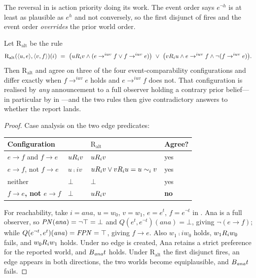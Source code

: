\documentclass[11pt,a4paper]{article}
\begin{document}
The reversal in  is action priority doing its work. The event order says
$e^{\neg h}$ is at least as plausible as $e^{h}$ and not conversely, so the first disjunct of
 fires and the event order \emph{overrides} the prior world order.

\begin{proposition}
\label{prop:divergence}
Let $\mathrm{R}_{\mathrm{alt}}$ be the rule
\[
  \mathrm{R}_{\mathrm{alt}}(\langle u,e\rangle,\langle v,f\rangle)(i) \ =\
  \big(u \plaus{i} v \wedge (e \to^{iuv} f \vee f \to^{iuv} e)\big) \ \vee\
  \big(v \plaus{i} u \wedge e \to^{iuv} f \wedge \neg (f \to^{iuv} e)\big).
\]
Then $\mathrm{R}_{\mathrm{alt}}$ and \Cref{def:update} agree on three of the four
event-comparability configurations and differ exactly when $f \to^{iuv} e$ holds and $e
\to^{iuv} f$ does not. That configuration is realised by \emph{any} announcement to a full
observer holding a contrary prior belief---in particular by \code{drone\_reports()} in
\Cref{lst:sar}---and the two rules then give contradictory answers to whether the
report lands.
\end{proposition}

\begin{proof}
Case analysis on the two edge predicates:
\begin{center}
\begin{tabular}{@{}llll@{}}
\toprule
Configuration & \Cref{def:update} & $\mathrm{R}_{\mathrm{alt}}$ & Agree? \\
\midrule
$e \to f$ and $f \to e$ & $u R_{i} v$ & $u R_{i} v$ & yes \\
$e \to f$, not $f \to e$ & $u \comp{i} v$ & $u R_{i} v \vee v R_{i} u = u \sim_{i} v$ & yes \\
neither & $\bot$ & $\bot$ & yes \\
\textbf{$f \to e$, not $e \to f$} & $\bot$ & $u R_{i} v$ & \textbf{no} \\
\bottomrule
\end{tabular}
\end{center}
For reachability, take $i = \mathit{ana}$, $u = w_0$, $v = w_1$, $e = e^{t}$, $f =
e^{\neg t}$ in . Ana is a full observer, so $\mathit{PN}(\mathit{ana}) = \neg\top = \bot$
and $Q(e^{t}, e^{\neg t})(\mathit{ana}) = \bot$, giving $\neg(e \to f)$; while
$Q(e^{\neg t}, e^{t})(\mathit{ana}) = \mathit{FPN} = \top$, giving $f \to e$. Also $w_1 \comp{i}
w_0$ holds, $w_1 R_{i} w_0$ fails, and $w_0 R_{i} w_1$ holds. Under 
no edge is created, Ana retains a strict preference for the reported world, and
$B_{\mathit{ana}}t$ holds. Under $\mathrm{R}_{\mathrm{alt}}$ the first disjunct
fires, an edge appears in both directions, the two worlds become equiplausible, and
$B_{\mathit{ana}}t$ fails.
\end{proof}
\end{document}
